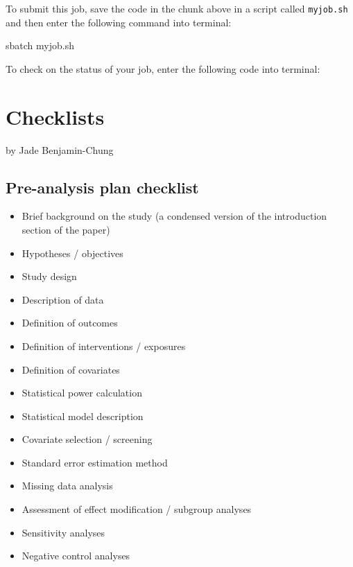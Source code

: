 \documentclass[
]{book}
\newenvironment{Shaded}{\begin{snugshade}}{\end{snugshade}}
\newcommand{\AttributeTok}[1]{\textcolor[rgb]{0.77,0.63,0.00}{#1}}
\newcommand{\ExtensionTok}[1]{#1}
\newcommand{\NormalTok}[1]{#1}
\newcommand{\VariableTok}[1]{\textcolor[rgb]{0.00,0.00,0.00}{#1}}
\providecommand{\tightlist}{%
  \setlength{\itemsep}{0pt}\setlength{\parskip}{0pt}}
\begin{document}
To submit this job, save the code in the chunk above in a script called \texttt{myjob.sh} and then enter the following command into terminal:

\begin{Shaded}
\begin{Highlighting}[]
\ExtensionTok{sbatch}\NormalTok{ myjob.sh }
\end{Highlighting}
\end{Shaded}

To check on the status of your job, enter the following code into terminal:

\begin{Shaded}
\end{Shaded}

\hypertarget{checklists}{%
\chapter{Checklists}\label{checklists}}

by Jade Benjamin-Chung

\hypertarget{pre-analysis-plan-checklist}{%
\section{Pre-analysis plan checklist}\label{pre-analysis-plan-checklist}}

\begin{itemize}
\tightlist
\item
  Brief background on the study (a condensed version of the introduction section of the paper)
\item
  Hypotheses / objectives
\item
  Study design
\item
  Description of data
\item
  Definition of outcomes
\item
  Definition of interventions / exposures
\item
  Definition of covariates
\item
  Statistical power calculation
\item
  Statistical model description
\item
  Covariate selection / screening
\item
  Standard error estimation method
\item
  Missing data analysis
\item
  Assessment of effect modification / subgroup analyses
\item
  Sensitivity analyses
\item
  Negative control analyses
\end{itemize}
\end{document}
